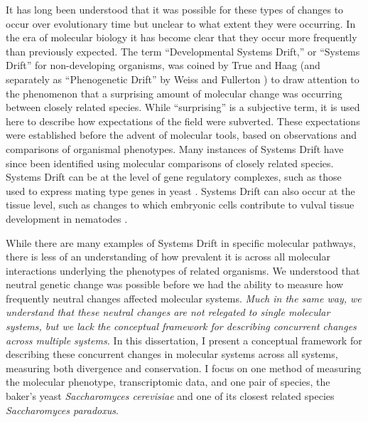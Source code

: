 It has long been understood that it was possible for these types of changes to occur over evolutionary time but unclear to what extent they were occurring. In the era of molecular biology it has become clear that they occur more frequently than previously expected. The term ``Developmental Systems Drift,'' or ``Systems Drift'' for non-developing organisms, was coined by True and Haag \cite{True2001} (and separately as ``Phenogenetic Drift'' by Weiss and Fullerton \cite{Weiss2000}) to draw attention to the phenomenon that a surprising amount of molecular change was occurring between closely related species. While ``surprising'' is a subjective term, it is used here to describe how expectations of the field were subverted. These expectations were established before the advent of molecular tools, based on observations and comparisons of organismal phenotypes. Many instances of Systems Drift have since been identified using molecular comparisons of closely related species. Systems Drift can be at the level of gene regulatory complexes, such as those used to express mating type genes in yeast \cite{Britton2020}. Systems Drift can also occur at the tissue level, such as changes to which embryonic cells contribute to vulval tissue development in nematodes \cite{Picao-Osorio2025}. 

While there are many examples of Systems Drift in specific molecular pathways, there is less of an understanding of how prevalent it is across all molecular interactions underlying the phenotypes of related organisms. We understood that neutral genetic change was possible before we had the ability to measure how frequently neutral changes affected molecular systems. \emph{Much in the same way, we understand that these neutral changes are not relegated to single molecular systems, but we lack the conceptual framework for describing concurrent changes across multiple systems.} In this dissertation, I present a conceptual framework for describing these concurrent changes in molecular systems across all systems, measuring both divergence and conservation. I focus on one method of measuring the molecular phenotype, transcriptomic data, and one pair of species, the baker's yeast \textit{Saccharomyces cerevisiae} and one of its closest related species \textit{Saccharomyces paradoxus}.

